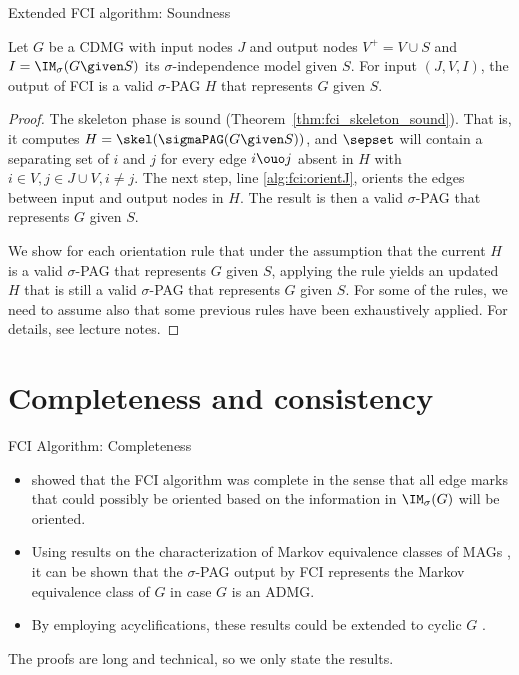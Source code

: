 \begin{frame}{Extended FCI algorithm: Soundness}
\begin{Thm}[\ref{thm:fci_sound}]
  Let $G$ be a CDMG with input nodes $J$ and output nodes $V^+ = V \cup S$ and $I = \IM_\sigma(G \given S)$ its $\sigma$-independence model given $S$.
  For input $(J,V,I)$, the output of FCI is a valid $\sigma$-PAG $H$ that represents $G$ given $S$.
\end{Thm}
\begin{proof}
  The skeleton phase is sound (Theorem~\ref{thm:fci_skeleton_sound}).
  That is, it computes $H = \skel(\sigmaPAG(G \given S))$, and $\sepset$ will contain a separating set of $i$ and $j$ for every edge $i \ouo j$ absent in $H$ with $i \in V, j \in J \cup V, i \ne j$.
  The next step, line \ref{alg:fci:orientJ}, orients the edges between input and output nodes in $H$. 
  The result is then a valid $\sigma$-PAG that represents $G$ given $S$.

  We show for each orientation rule that under the assumption that the current $H$ is a valid $\sigma$-PAG that represents $G$ given $S$, applying the rule yields an updated $H$ that is still a valid $\sigma$-PAG that represents $G$ given $S$.
  For some of the rules, we need to assume also that some previous rules have been exhaustively applied.
  For details, see lecture notes.
\end{proof}
\end{frame}

\section{Completeness and consistency}
\frame{\sectionpage}

\begin{frame}{FCI Algorithm: Completeness}
  \begin{itemize}
    \item \cite{Zhang2008_AI} showed that the FCI algorithm was complete in the sense that all edge marks that could possibly be oriented based on the information in $\IM_\sigma(G)$ will be oriented.
    \item Using results on the characterization of Markov equivalence classes of MAGs \cite{Ali++2005}, it can be shown that the $\sigma$-PAG output by FCI represents the Markov equivalence class of $G$ in case $G$ is an ADMG.
    \item By employing acyclifications, these results could be extended to cyclic $G$ \cite{MooijClaassen_UAI_20}.
  \end{itemize}
  The proofs are long and technical, so we only state the results.
\end{frame}

